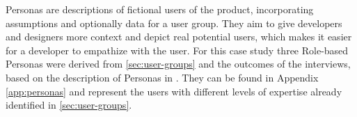 Personas are descriptions of fictional users of the product, incorporating assumptions and optionally data for a user group.
They aim to give developers and designers more context and depict real potential users, which makes it easier for a developer to empathize with the user.
For this case study three Role-based Personas were derived from \ref{sec:user-groups} and the outcomes of the interviews, based on the description of Personas in \cite[pp. 403-405]{Interactiondesign:2019ys}. They can be found in Appendix \ref{app:personas} and represent the users with different levels of expertise already identified in \ref{sec:user-groups}.